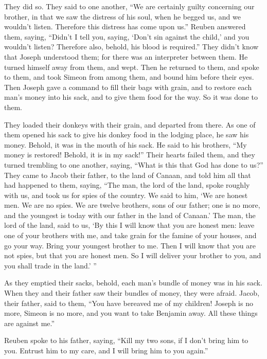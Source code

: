 They did so.  \myverse{}They said to one another, “We are certainly guilty concerning our brother, in that we saw the distress of his soul, when he begged us, and we wouldn’t listen. Therefore this distress has come upon us.”  \myverse{}Reuben answered them, saying, “Didn’t I tell you, saying, ‘Don’t sin against the child,’ and you wouldn’t listen? Therefore also, behold, his blood is required.”  \myverse{}They didn’t know that Joseph understood them; for there was an interpreter between them.  \myverse{}He turned himself away from them, and wept. Then he returned to them, and spoke to them, and took Simeon from among them, and bound him before their eyes.  \myverse{}Then Joseph gave a command to fill their bags with grain, and to restore each man’s money into his sack, and to give them food for the way. So it was done to them.

\myverse{}They loaded their donkeys with their grain, and departed from there.  \myverse{}As one of them opened his sack to give his donkey food in the lodging place, he saw his money. Behold, it was in the mouth of his sack.  \myverse{}He said to his brothers, “My money is restored! Behold, it is in my sack!” Their hearts failed them, and they turned trembling to one another, saying, “What is this that God has done to us?”  \myverse{}They came to Jacob their father, to the land of Canaan, and told him all that had happened to them, saying,  \myverse{}“The man, the lord of the land, spoke roughly with us, and took us for spies of the country.  \myverse{}We said to him, ‘We are honest men. We are no spies.  \myverse{}We are twelve brothers, sons of our father; one is no more, and the youngest is today with our father in the land of Canaan.’  \myverse{}The man, the lord of the land, said to us, ‘By this I will know that you are honest men: leave one of your brothers with me, and take grain for the famine of your houses, and go your way.  \myverse{}Bring your youngest brother to me. Then I will know that you are not spies, but that you are honest men. So I will deliver your brother to you, and you shall trade in the land.’ ”

\myverse{}As they emptied their sacks, behold, each man’s bundle of money was in his sack. When they and their father saw their bundles of money, they were afraid.  \myverse{}Jacob, their father, said to them, “You have bereaved me of my children! Joseph is no more, Simeon is no more, and you want to take Benjamin away. All these things are against me.”

\myverse{}Reuben spoke to his father, saying, “Kill my two sons, if I don’t bring him to you. Entrust him to my care, and I will bring him to you again.”

